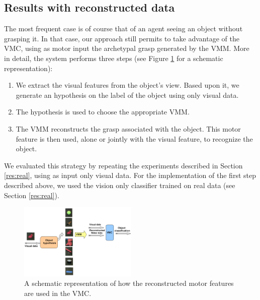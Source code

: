 \subsection{Results with reconstructed data}
\label{res:reconstruct}


The most frequent case is of course that of an agent seeing an object without grasping it. 
In that case, our approach  still permits to take advantage of the VMC, using as 
motor input the archetypal grasp generated by the VMM.
More in detail, the system 
performs three steps (see Figure \ref{fig::reconstructed-schema} for a schematic representation):
\begin{enumerate}
  \item We extract the visual features  from the object's view. Based upon
    it, we generate an hypothesis on %
	the label of the object using only visual data. 
  \item The hypothesis is used to choose the appropriate VMM.
  \item The VMM reconstructs the grasp associated with the object. This
    motor feature is then used, alone or jointly with the visual feature, to recognize the object.
\end{enumerate}
We evaluated this strategy by repeating the experiments described in Section \ref{res:real}, using as input only visual data.
For the implementation of the first step described above, we used the vision only classifier trained on real data
(see Section \ref{res:real}).


\begin{figure}
        \centering
        \includegraphics[width=0.5\textwidth]{images/schema_process.pdf}
        \caption{A schematic representation of how the reconstructed motor features are used in the VMC.}
        \label{fig::reconstructed-schema}
\end{figure}



 

